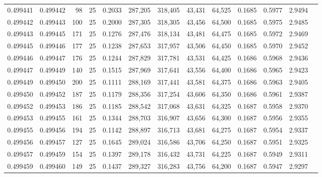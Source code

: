 \begin{tabular}{rrrrrrrrrrrrr}
0.499441 & 0.499442 &  98 &  25 &                                     0.2033 & 287,205 & 318,405 &  43,431 &  64,525 & 0.1685 & 0.5977 & 2.9494 \\
0.499442 & 0.499443 & 100 &  25 &                                     0.2000 & 287,305 & 318,305 &  43,456 &  64,500 & 0.1685 & 0.5975 & 2.9485 \\
0.499443 & 0.499445 & 171 &  25 &                                     0.1276 & 287,476 & 318,134 &  43,481 &  64,475 & 0.1685 & 0.5972 & 2.9469 \\
0.499445 & 0.499446 & 177 &  25 &                                     0.1238 & 287,653 & 317,957 &  43,506 &  64,450 & 0.1685 & 0.5970 & 2.9452 \\
0.499446 & 0.499447 & 176 &  25 &                                     0.1244 & 287,829 & 317,781 &  43,531 &  64,425 & 0.1686 & 0.5968 & 2.9436 \\
0.499447 & 0.499449 & 140 &  25 &                                     0.1515 & 287,969 & 317,641 &  43,556 &  64,400 & 0.1686 & 0.5965 & 2.9423 \\
0.499449 & 0.499450 & 200 &  25 &                                     0.1111 & 288,169 & 317,441 &  43,581 &  64,375 & 0.1686 & 0.5963 & 2.9405 \\
0.499450 & 0.499452 & 187 &  25 &                                     0.1179 & 288,356 & 317,254 &  43,606 &  64,350 & 0.1686 & 0.5961 & 2.9387 \\
0.499452 & 0.499453 & 186 &  25 &                                     0.1185 & 288,542 & 317,068 &  43,631 &  64,325 & 0.1687 & 0.5958 & 2.9370 \\
0.499453 & 0.499455 & 161 &  25 &                                     0.1344 & 288,703 & 316,907 &  43,656 &  64,300 & 0.1687 & 0.5956 & 2.9355 \\
0.499455 & 0.499456 & 194 &  25 &                                     0.1142 & 288,897 & 316,713 &  43,681 &  64,275 & 0.1687 & 0.5954 & 2.9337 \\
0.499456 & 0.499457 & 127 &  25 &                                     0.1645 & 289,024 & 316,586 &  43,706 &  64,250 & 0.1687 & 0.5951 & 2.9325 \\
0.499457 & 0.499459 & 154 &  25 &                                     0.1397 & 289,178 & 316,432 &  43,731 &  64,225 & 0.1687 & 0.5949 & 2.9311 \\
0.499459 & 0.499460 & 149 &  25 &                                     0.1437 & 289,327 & 316,283 &  43,756 &  64,200 & 0.1687 & 0.5947 & 2.9297 \\

\end{tabular}
